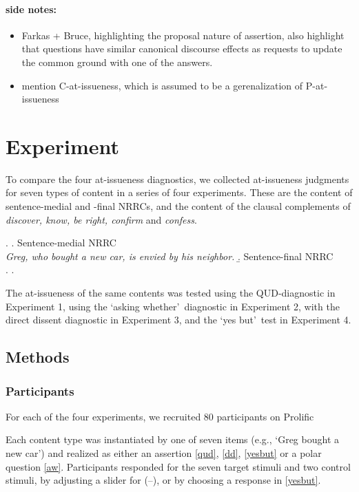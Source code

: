 \documentclass[12pt]{article}
\begin{document}
    \paragraph{side notes:}
    \begin{itemize}
      \item Farkas + Bruce, highlighting the proposal nature of assertion, also highlight that questions have similar canonical discourse effects as requests to update the common ground with one of the answers. 
      \item mention C-at-issueness, which is assumed to be a gerenalization of P-at-issueness
    \end{itemize}

\section{Experiment}
  
  To compare the four at-issueness diagnostics, we collected at-issueness judgments for seven types of content in a series of four experiments. These are the content of sentence-medial and -final NRRCs, and the content of the clausal complements of \emph{discover, know, be right, confirm} and \emph{confess}.

    \ex.
      \a. Sentence-medial NRRC\\
        \emph{Greg, who bought a new car, is envied by his neighbor.}
      \b. Sentence-final NRRC\\
      \z.
    \z.

    The at-issueness of the same contents was tested using the QUD-diagnostic in Experiment 1, using the \lq asking whether\rq\ diagnostic in Experiment 2, with the direct dissent diagnostic in Experiment 3, and the \lq yes but\rq\ test in Experiment 4.

  \subsection{Methods}
    \subsubsection{Participants}
      For each of the four experiments, we recruited 80 participants on Prolific

     Each content type was instantiated by one of seven items (e.g., `Greg bought a new car') and realized as either an assertion \ref{qud}, \ref{dd}, \ref{yesbut} or a polar question \ref{aw}. Participants responded for the seven target stimuli and two control stimuli, by adjusting a slider for (--), or by choosing a response in \ref{yesbut}.
\end{document}

